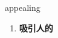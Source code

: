 
\begin{frame}
{\huge appealing}
\begin{center}
\begin{enumerate}\Large
  \item \textbf{吸引人的}
\end{enumerate}
\end{center}
\end{frame}
